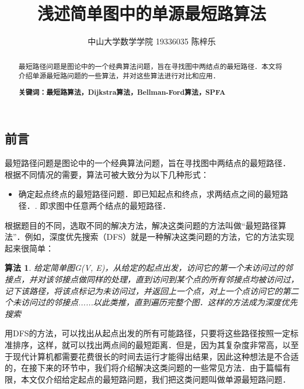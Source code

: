 \documentclass {article}
\begin{document}
\title {浅述简单图中的单源最短路算法}
\author {中山大学数学学院 19336035 陈梓乐}
\maketitle
\begin {abstract}
最短路径问题是图论中的一个经典算法问题，旨在寻找图中两结点的最短路径．本文将介绍单源最短路问题的一些算法，并对这些算法进行对比和应用．
\par\textbf{关键词：最短路算法，Dijkstra算法，Bellman-Ford算法，SPFA}
\end {abstract}
\tableofcontents
\newtheorem {define} {定义}
\newtheorem {theorm} {算法}
\newtheorem {extra} {定理}
\newtheorem {ex} {例}

\begin {center}
\section {前言}
\end {center}

最短路径问题是图论中的一个经典算法问题，旨在寻找图中两结点的最短路径．
根据不同情况的需要，算法可被大致分为以下几种形式：\begin {itemize} ．即给出图中一结点为起点，求任意一点为终点所需要的最低代价．．与确定起点的问题相反，该问题是已知终结结点，求最短路径的问题．在无向图中该问题与确定起点的问题完全等同，在有向图中该问题等同于把所有路径方向反转的确定起点的问题．\item 确定起点终点的最短路径问题．即已知起点和终点，求两结点之间的最短路径．. 即求图中任意两个结点的最短路径．\cite {ref1} \end {itemize} 

根据题目的不同，选取不同的解决方法，解决这类问题的方法叫做“最短路径算法”．例如，深度优先搜索（DFS）就是一种解决这类问题的方法，它的方法实现起来很简单：\begin {theorm} 给定简单图G(V, E)，从给定的起点出发，访问它的第一个未访问过的邻接点，并对该邻接点做同样的处理，直到访问到某个点的所有邻接点均被访问过，记下该路径，将该点标记为未访问过，并返回上一个点，对上一个点访问它的第二个未访问过的邻接点......以此类推，直到遍历完整个图．这样的方法成为深度优先搜索\cite {ref2}\end {theorm}

用DFS的方法，可以找出从起点出发的所有可能路径，只要将这些路径按照一定标准排序，这样，就可以找出两点间的最短距离．但是，因为其复杂度非常高，以至于现代计算机都需要花费很长的时间去运行才能得出结果，因此这种想法是不合适的，在接下来的环节中，我们将介绍解决这类问题的一些常见方法．由于篇幅有限，本文仅介绍给定起点的最短路问题，我们把这类问题叫做单源最短路问题．
\end{document}
